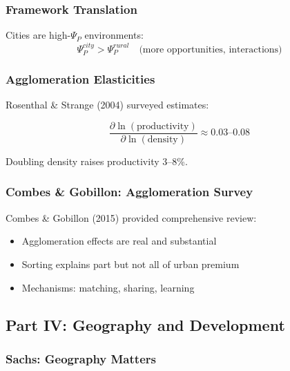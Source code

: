 \subsubsection{Framework Translation}

Cities are high-$\Psi_P$ environments:
\begin{equation}
\Psi_P^{city} > \Psi_P^{rural} \quad \text{(more opportunities, interactions)}
\end{equation}

\subsubsection{Agglomeration Elasticities}

Rosenthal \& Strange (2004) surveyed estimates:

\begin{equation}
\frac{\partial \ln(\text{productivity})}{\partial \ln(\text{density})} \approx 0.03\text{--}0.08
\end{equation}

Doubling density raises productivity 3--8\%.

\subsubsection{Combes \& Gobillon: Agglomeration Survey}

Combes \& Gobillon (2015) provided comprehensive review:
\begin{itemize}
    \item Agglomeration effects are real and substantial
    \item Sorting explains part but not all of urban premium
    \item Mechanisms: matching, sharing, learning
\end{itemize}

\subsection{Part IV: Geography and Development}

\subsubsection{Sachs: Geography Matters}


